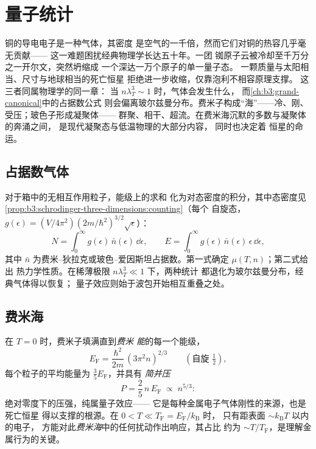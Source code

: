 \chapter{量子统计}\label{ch:b3:quantum-statistics}

铜的导电电子是一种气体，其密度
是空气的一千倍，然而它们对铜的热容几乎毫无贡献——
这一难题困扰经典物理学长达五十年。一团
铷原子云被冷却至千万分之一开尔文，突然坍缩成
一个深达一万个原子的单一量子态。
一颗质量与太阳相当、尺寸与地球相当的死亡恒星
拒绝进一步收缩，仅靠泡利不相容原理支撑。
这三者同属物理学的同一章：
当 $n\lambda_T^3 \sim 1$ 时，气体会发生什么，
而\cref{ch:b3:grand-canonical}中的占据数公式
则会偏离玻尔兹曼分布。费米子构成“海”——冷、刚、受压；玻色子形成凝聚体——
群聚、相干、超流。在费米海沉默的多数与凝聚体的奔涌之间，
是现代凝聚态与低温物理的大部分内容，
同时也决定着
恒星的命运。

\section{占据数气体}

\begin{proposition}[量子气体的基本方法]\label{prop:b3:quantum-statistics:machinery}
对于箱中的无相互作用粒子，能级上的求和
化为对态密度的积分，其中态密度见
\cref{prop:b3:schrodinger-three-dimensions:counting}（每个
自旋态，$g(\epsilon) = (V/4\pi^2)(2m/\hbar^2)^{3/2}\sqrt\epsilon$）：
\[
N = \int_0^\infty g(\epsilon)\,\bar n(\epsilon)\,\dd\epsilon ,
\qquad
E = \int_0^\infty g(\epsilon)\,\bar n(\epsilon)\,\epsilon\,
\dd\epsilon ,
\]
其中 $\bar n$ 为费米–狄拉克或玻色–爱因斯坦占据数。第一式确定
$\mu(T, n)$；第二式给出
热力学性质。在稀薄极限 $n\lambda_T^3 \ll 1$ 下，两种统计
都退化为玻尔兹曼分布，经典气体得以恢复；
量子效应则始于波包开始相互重叠之处。
\end{proposition}
\admitted

\section{费米海}

\begin{theorem}[简并费米气体]\label{thm:b3:quantum-statistics:fermi}
在 $T = 0$ 时，费米子填满直到\emph{费米
能}的每一个能级，
\[
E_{\text{F}} = \frac{\hbar^2}{2m}\,(3\pi^2n)^{2/3}
\qquad (\text{自旋 } \tfrac12) ,
\]
每个粒子的平均能量为 $\tfrac35 E_{\text{F}}$，并具有
\emph{简并压}
\[
P = \frac25\,n\,E_{\text{F}} \;\propto\; n^{5/3} :
\]
绝对零度下的压强，纯属量子效应——
它是每种金属电子气体刚性的来源，也是死亡恒星
得以支撑的根源。在 $0 < T \ll T_{\text{F}} = E_{\text{F}}/k_{\text{B}}$ 时，
只有距表面 $\sim k_{\text{B}}T$ 以内的电子，
方能对此\emph{费米海}中的任何扰动作出响应，其占比
约为 $\sim T/T_{\text{F}}$，是理解金属行为的关键。
\end{theorem}

